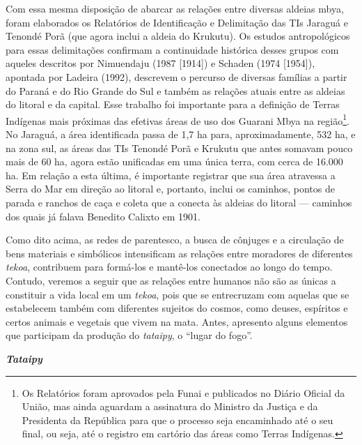 Com essa mesma disposição de abarcar as relações entre diversas aldeias
mbya, foram elaborados os Relatórios de Identificação e Delimitação das
TIs Jaraguá e Tenondé Porã (que agora inclui a aldeia do Krukutu). Os
estudos antropológicos para essas delimitações confirmam a continuidade
histórica desses grupos com aqueles descritos por Nimuendaju (1987
{[}1914{]}) e Schaden (1974 {[}1954{]}), apontada por Ladeira (1992),
descrevem o percurso de diversas famílias a partir do Paraná e do Rio
Grande do Sul e também as relações atuais entre as aldeias do litoral e
da capital. Esse trabalho foi importante para a definição de Terras
Indígenas mais próximas das efetivas áreas de uso dos Guarani Mbya na
região\footnote{Os Relatórios foram aprovados pela Funai e publicados no
  Diário Oficial da União, mas ainda aguardam a assinatura do Ministro
  da Justiça e da Presidenta da República para que o processo seja
  encaminhado até o seu final, ou seja, até o registro em cartório das
  áreas como Terras Indígenas.}. No Jaraguá, a área identificada passa
de 1,7 ha para, aproximadamente, 532 ha, e na zona sul, as áreas das TIs
Tenondé Porã e Krukutu que antes somavam pouco mais de 60 ha, agora
estão unificadas em uma única terra, com cerca de 16.000 ha. Em relação
a esta última, é importante registrar que sua área atravessa a Serra do
Mar em direção ao litoral e, portanto, inclui os caminhos, pontos de
parada e ranchos de caça e coleta que a conecta às aldeias do litoral
--- caminhos dos quais já falava Benedito Calixto em 1901.

Como dito acima, as redes de parentesco, a busca de cônjuges e a
circulação de bens materiais e simbólicos intensificam as relações entre
moradores de diferentes \emph{tekoa}, contribuem para formá-los e
mantê-los conectados ao longo do tempo. Contudo, veremos a seguir que as
relações entre humanos não são as únicas a constituir a vida local em um
\emph{tekoa}, pois que se entrecruzam com aquelas que se estabelecem
também com diferentes sujeitos do cosmos, como deuses, espíritos e
certos animais e vegetais que vivem na mata. Antes, apresento alguns
elementos que participam da produção do \emph{tataipy}, o ``lugar do
fogo''.

\emph{\textbf{Tataipy}}

